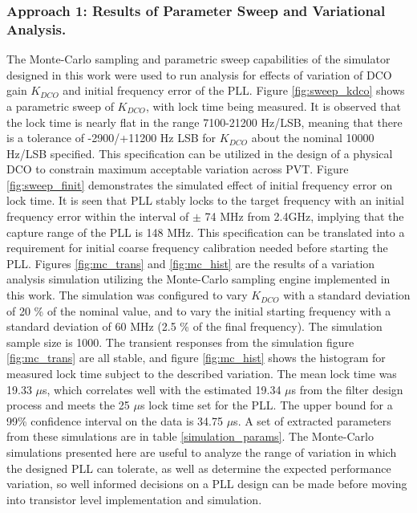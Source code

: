 \subsubsection{Approach 1: Results of Parameter Sweep and Variational Analysis.}
The Monte-Carlo sampling and parametric sweep capabilities of the simulator designed in this work were used to run analysis for effects of variation of DCO gain $K_{DCO}$ and initial frequency error of the PLL. Figure \ref{fig:sweep_kdco} shows a parametric sweep of $K_{DCO}$, with lock time being measured. It is observed that the lock time is nearly flat in the range 7100-21200 Hz/LSB, meaning that there is a tolerance of -2900/+11200 Hz LSB for $K_{DCO}$ about the nominal 10000 Hz/LSB specified. This specification can be utilized in the design of a physical DCO to constrain maximum acceptable variation across PVT. Figure \ref{fig:sweep_finit} demonstrates the simulated effect of initial frequency error on lock time. It is seen that PLL stably locks to the target frequency with an initial frequency error within the interval of $\pm$ 74 MHz from 2.4GHz, implying that the capture range of the PLL is 148 MHz. This specification can be translated into a requirement for initial coarse frequency calibration needed before starting the PLL. Figures \ref{fig:mc_trans} and \ref{fig:mc_hist} are the results of a variation analysis simulation utilizing the Monte-Carlo sampling engine implemented in this work. The simulation was configured to vary $K_{DCO}$ with a standard deviation of 20 \% of the nominal value, and to vary the initial starting frequency with a standard deviation of 60 MHz (2.5 \% of the final frequency). The simulation sample size is 1000. The transient responses from the simulation figure \ref{fig:mc_trans} are all stable, and figure \ref{fig:mc_hist} shows the histogram for measured lock time subject to the described variation. The mean lock time was 19.33 $\mu$s, which correlates well with the estimated 19.34 $\mu$s from the filter design process and meets the 25 $\mu$s lock time set for the PLL. The upper bound for a 99\% confidence interval on the data is 34.75 $\mu$s. A set of extracted parameters from these simulations are in table \ref{simulation_params}. The Monte-Carlo simulations presented here are useful to analyze the range of variation in which the designed PLL can tolerate, as well as determine the expected performance variation, so well informed decisions on a PLL design can be made before moving into transistor level implementation and simulation. 

